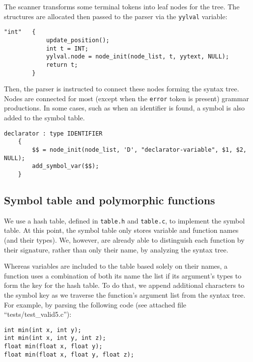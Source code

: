\documentclass[12pt]{article}
\begin{document}
The scanner transforms some terminal tokens into leaf nodes for the tree. The structures
are allocated then passed to the parser via the \texttt{yylval} variable:

\begin{lstlisting}[caption={Example lexer rule where a leaf node is created. This procedure is done for
all data types, identifiers and constants.},captionpos=b]
"int"	{
			update_position();
			int t = INT;
			yylval.node = node_init(node_list, t, yytext, NULL);
			return t;
		}
\end{lstlisting}

Then, the parser is instructed to connect these nodes forming the syntax tree.
Nodes are connected for most (except when the \texttt{error} token is present)
grammar productions. In some cases, such as when an identifier is found, a symbol is also added
to the symbol table.

\begin{lstlisting}[caption={Example parser rule where nodes are connected.
This procedure is done for all productions, except error handlers. Here, a symbol
is also added to the symbol table through the function \texttt{add\_symbol\_var}},captionpos=b]
declarator : type IDENTIFIER 
	{
		$$ = node_init(node_list, 'D', "declarator-variable", $1, $2, NULL);
		add_symbol_var($$);
	}
\end{lstlisting}

\subsection{Symbol table and polymorphic functions}
We use a hash table, defined in \texttt{table.h} and \texttt{table.c}, to implement the symbol
table. At this point, the symbol table only stores variable and function names (and their types).
We, however, are already able to distinguish each function by their signature, rather than
only their name, by analyzing the syntax tree.

Whereas variables are included to the table based solely on their names, a function uses a
combination of both its name the list if its argument's types to form the key for the hash
table. To do that, we append additional characters to the symbol key as we traverse the
function's argument list from the syntax tree. For example, by parsing the following code
(see attached file ``tests/test\_valid5.c''):

\begin{lstlisting}
int min(int x, int y);
int min(int x, int y, int z);
float min(float x, float y);
float min(float x, float y, float z);
\end{lstlisting}
\end{document}
